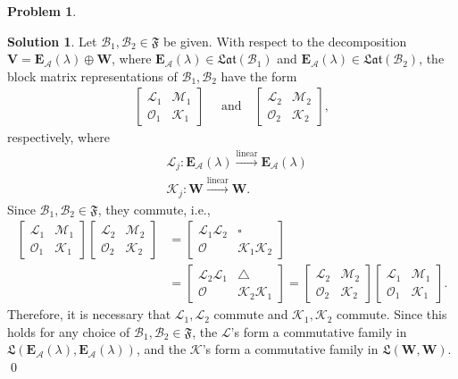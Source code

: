 \documentclass{book}
\theoremstyle{definition}
\newtheorem*{prob*}{Problem}
\newtheorem*{sln*}{Solution}
\newcommand{\V}{\mathbf{V}}
\newcommand{\W}{\mathbf{W}}
\newcommand{\A}{\mathcal{A}}
\newcommand{\B}{\mathcal{B}}
\newcommand{\lag}{\mathcal{L}}
\newcommand{\M}{\mathcal{M}}
\newcommand{\K}{\mathcal{K}}
\newcommand{\lin}{\overset{\text{linear}}{\longrightarrow}}
\newcommand{\FF}{\mathfrak{F}}
\newcommand{\LL}{\mathfrak{L}}
\newcommand{\lat}{\mathfrak{Lat}}
\begin{document}
\begin{prob*}
\begin{sln*}
		Let $\mathcal{B}_1, \B_2 \in \FF$ be given. With respect to the decomposition $\V = \textbf{E}_\A(\lambda) \oplus \W$, where $\textbf{E}_\A(\lambda) \in \lat(\B_1)$ and $\textbf{E}_\A(\lambda) \in \lat(\B_2)$, the block matrix representations of $\B_1, \B_2$ have the form
		\begin{align*}
		\begin{bmatrix}
		\lag_1 & \M_1 \\
		\mathcal{O}_1 & \K_1
		\end{bmatrix}
		\quad \text{ and} \quad
		\begin{bmatrix}
		\lag_2 & \M_2 \\
		\mathcal{O}_2 & \K_2
		\end{bmatrix},
		\end{align*} 
		respectively, where 
		\begin{align*}
		&\lag_j : \textbf{E}_\A(\lambda) \lin \textbf{E}_\A(\lambda)\\
		&\K_j : \W \lin \W.
		\end{align*}
		Since $\mathcal{B}_1, \B_2 \in \FF$, they commute, i.e., 
		\begin{align*}
		\begin{bmatrix}
		\lag_1 & \M_1 \\
		\mathcal{O}_1 & \K_1
		\end{bmatrix}\begin{bmatrix}
		\lag_2 & \M_2 \\
		\mathcal{O}_2 & \K_2
		\end{bmatrix}
		&=
		\begin{bmatrix}
		\lag_1\lag_2 & \square\\
		\mathcal{O} & \K_1\K_2
		\end{bmatrix}\\
		&=
		\begin{bmatrix}
		\lag_2\lag_1 & \triangle\\
		\mathcal{O} & \K_2\K_1
		\end{bmatrix}
		=
		\begin{bmatrix}
		\lag_2 & \M_2 \\
		\mathcal{O}_2 & \K_2
		\end{bmatrix}
		\begin{bmatrix}
		\lag_1 & \M_1 \\
		\mathcal{O}_1 & \K_1
		\end{bmatrix}.
		\end{align*}
		Therefore, it is necessary that $\lag_1, \lag_2$ commute and $\K_1, \K_2$ commute. Since this holds for any choice of $\B_1, \B_2 \in \FF$, the $\lag$'s form a commutative family in $\LL\left(\textbf{E}_\A(\lambda), \textbf{E}_\A(\lambda)\right)$, and the $\K$'s form a commutative family in $\LL\left(\W, \W\right)$. \qed
		
		
	\end{sln*}
	
\end{prob*}
\end{document}
